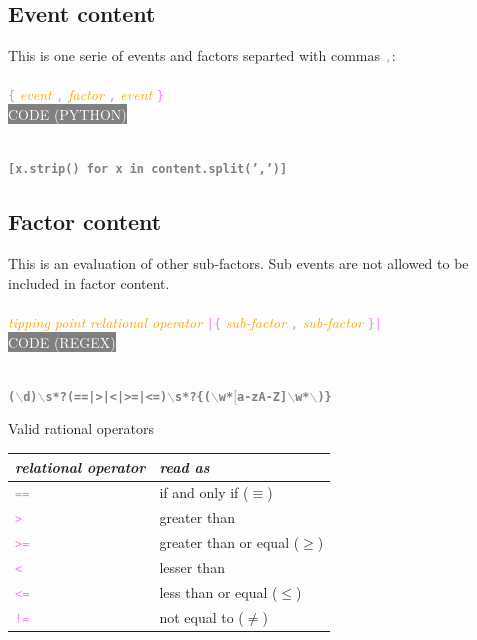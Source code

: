 \documentclass[15pt,a4paper,oneside]{report}
\newcommand{\regex}[1]{{\tiny\\\colorbox{grey}{\textcolor{white}{CODE (REGEX)}\hspace{0.87\textwidth}}}\vspace{-2.2em}\\\begin{framed}\bf{\textcolor{grey}{\vspace{-1.5em}\\\texttt{\small #1}}}\vspace{-0.33em}\end{framed}\vspace{-0.75em}}
\newcommand{\python}[1]{{\tiny\\\colorbox{grey}{\textcolor{white}{\tiny CODE (PYTHON)}\hspace{0.855\textwidth}}}\vspace{-2.2em}\\\begin{framed}\bf{\textcolor{grey}{\vspace{-1.5em}\\\texttt{\small #1}}}\vspace{-0.33em}\end{framed}\vspace{-0.75em}}
\newcommand{\code}[1]{{\textcolor{violet}{\texttt{\small #1}}}}
\newcommand{\comment}[1]{{\textcolor{orange}{\it #1}}}
\begin{document}
\subsection{Event content}
This is one serie of events and factors separted with commas \code{,}:\\\\
\code{\{} \comment{event} \code{,} \comment{factor} \code{,} \comment{event} \code{\}}
\python{[x.strip() for x in content.split(',')]}
\subsection{Factor content}
This is an evaluation of other sub-factors. Sub events are not allowed to be included in factor content.\\\\
\code{} \comment{tipping point} \hspace{2em} \comment{relational operator} \code{|\{} \comment{sub-factor} \code{,} \comment{sub-factor} \code{\}|}
\regex{($\backslash$d)$\backslash$s*?(==|>|<|>=|<=)$\backslash$s*?\{($\backslash$w*$[$a-zA-Z]$\backslash$w*$\backslash$)\}}
Valid rational operators

\begin{tabular}{l|l}
{\it relational operator} & {\it read as}\\
\hline{\textcolor{violet}{\tt ==}} & if and only if ($\equiv$)\\
{\textcolor{violet}{\tt >}} & greater than \\
{\textcolor{violet}{\tt >=}} & greater than or equal ($\geq$)\\
{\textcolor{violet}{\tt <}} & lesser than\\
{\textcolor{violet}{\tt <=}} & less than or equal ($\leq$)\\
{\textcolor{violet}{\tt !=}} & not equal to ($\neq$)\\
\end{tabular}\\\\\\
\end{document}
